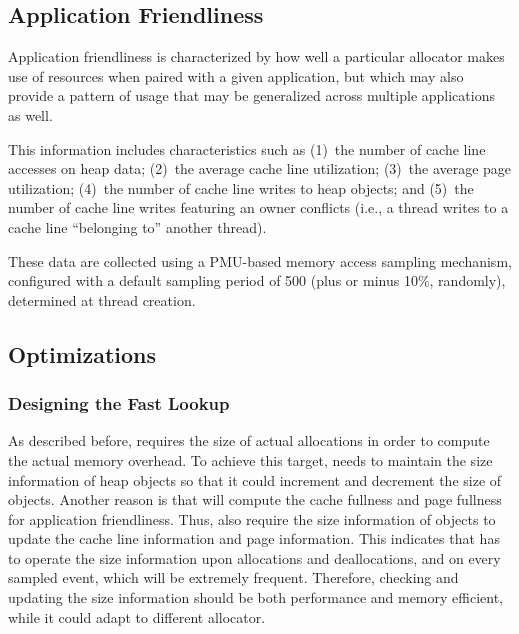 

\subsection{Application Friendliness}
Application friendliness is characterized by how well a particular allocator makes use of resources when paired with a given application, but which may also provide a pattern of usage that may be generalized across multiple applications as well.

This information includes characteristics such as (1)~the number of cache line accesses on heap data; (2)~the average cache line utilization; (3)~the average page utilization; (4)~the number of cache line writes to heap objects; and (5)~the number of cache line writes featuring an owner conflicts (i.e., a thread writes to a cache line ``belonging to'' another thread).

These data are collected using a PMU-based memory access sampling mechanism, configured with a default sampling period of 500 (plus or minus 10\%, randomly), determined at thread creation.

\subsection{Optimizations}

\subsubsection{Designing the Fast Lookup}

\label{sec:fastlookup}

As described before, \MP{} requires the size of actual allocations in order to compute the actual memory overhead. To achieve this target, \MP{} needs to maintain the size information of heap objects so that it could increment and decrement the size of objects. Another reason is that \MP{} will compute the cache fullness and page fullness for application friendliness. Thus, \MP{} also require the size information of objects to update the cache line information and page information. This indicates that \MP{} has to operate the size information upon allocations and deallocations, and on every sampled event, which will be extremely frequent. Therefore, checking and updating the size information should be both performance and memory efficient, while it could adapt to different allocator. 

